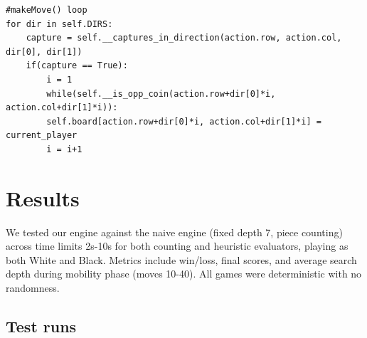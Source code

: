 \documentclass[10pt, titlepage, oneside, a4paper]{article}
\begin{document}
\begin{verbatim}
#makeMove() loop
for dir in self.DIRS:
    capture = self.__captures_in_direction(action.row, action.col, dir[0], dir[1])
    if(capture == True):
        i = 1
        while(self.__is_opp_coin(action.row+dir[0]*i, action.col+dir[1]*i)):
        self.board[action.row+dir[0]*i, action.col+dir[1]*i] = current_player
        i = i+1
\end{verbatim}



\section{Results}
\label{sec:results}
We tested our engine against the naive engine (fixed depth 7, piece counting) across time limits 2s-10s for both counting and heuristic evaluators, playing as both White and Black. Metrics include win/loss, final scores, and average search depth during mobility phase (moves 10-40). All games were deterministic with no randomness.


\subsection{Test runs}
\label{sec:testruns}
\end{document}
